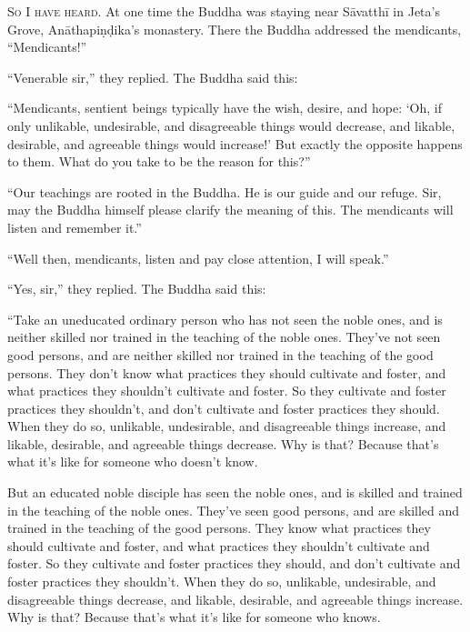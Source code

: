 \documentclass[12pt,openany]{book}%
\newcommand*{\scevam}[1]{\textsc{#1}}
\begin{document}
\scevam{So I have heard. }At one time the Buddha was staying near \textsanskrit{Sāvatthī} in Jeta’s Grove, \textsanskrit{Anāthapiṇḍika}’s monastery. There the Buddha addressed the mendicants, “Mendicants!” 

“Venerable sir,” they replied. The Buddha said this: 

“Mendicants, sentient beings typically have the wish, desire, and hope: ‘Oh, if only unlikable, undesirable, and disagreeable things would decrease, and likable, desirable, and agreeable things would increase!’ But exactly the opposite happens to them. What do you take to be the reason for this?” 

“Our teachings are rooted in the Buddha. He is our guide and our refuge. Sir, may the Buddha himself please clarify the meaning of this. The mendicants will listen and remember it.” 

“Well then, mendicants, listen and pay close attention, I will speak.” 

“Yes, sir,” they replied. The Buddha said this: 

“Take an uneducated ordinary person who has not seen the noble ones, and is neither skilled nor trained in the teaching of the noble ones. They’ve not seen good persons, and are neither skilled nor trained in the teaching of the good persons. They don’t know what practices they should cultivate and foster, and what practices they shouldn’t cultivate and foster. So they cultivate and foster practices they shouldn’t, and don’t cultivate and foster practices they should. When they do so, unlikable, undesirable, and disagreeable things increase, and likable, desirable, and agreeable things decrease. Why is that? Because that’s what it’s like for someone who doesn’t know. 

But an educated noble disciple has seen the noble ones, and is skilled and trained in the teaching of the noble ones. They’ve seen good persons, and are skilled and trained in the teaching of the good persons. They know what practices they should cultivate and foster, and what practices they shouldn’t cultivate and foster. So they cultivate and foster practices they should, and don’t cultivate and foster practices they shouldn’t. When they do so, unlikable, undesirable, and disagreeable things decrease, and likable, desirable, and agreeable things increase. Why is that? Because that’s what it’s like for someone who knows. 
\end{document}
